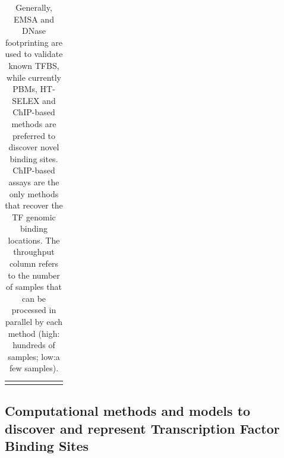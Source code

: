 \documentclass[a4paper, titlepage, openright]{book}
\begin{document}
\begin{longtable}{|p{2.4cm}|p{4cm}|p{1.75cm}|p{1.5cm}|p{1cm}|p{2.3cm}|p{2cm}|}
		\hline
	\caption[\emph{In vivo} and \emph{in vitro} experimental assays to identify and validate transcription factor binding sites.]{Generally, EMSA and DNase footprinting are used to validate known TFBS, while currently PBMs, HT-SELEX and ChIP-based methods are preferred to discover novel binding sites. ChIP-based assays are the only methods that recover the TF genomic binding locations. The throughput column refers to the number of samples that can be processed in parallel by each method (high: hundreds of samples; low:a few samples).}
	\label{table:assays}
\end{longtable}

\subsection{Computational methods and models to discover and represent Transcription Factor Binding Sites}
\end{document}
